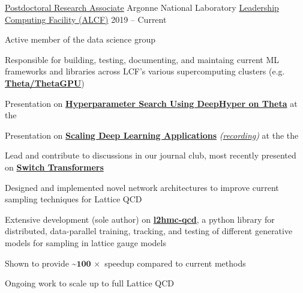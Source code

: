 \begin{cventries}

  \cventry
  {\href{https://www.alcf.anl.gov/about/people/sam-foreman}{\textcolor{awlink}{Postdoctoral Research Associate}}}
  {Argonne National Laboratory}
  {\href{https://www.alcf.anl.gov}{\textcolor{awesome}{Leadership Computing Facility (ALCF)}}}
  {2019 -- Current}
  {
    \begin{cvitems}
    \item {Active member of the data science group}
      \begin{cvsubitems}
      \item{Responsible for building, testing, documenting, and maintaing current ML frameworks and libraries across
        LCF's various supercomputing clusters (e.g.
      \textbf{\href{https://argonne-lcf.github.io/ThetaGPU-Docs/}{Theta/ThetaGPU}})}
      \item{Presentation on \href{https://bit.ly/DeepHyperSDL21}{\textbf{Hyperparameter Search Using DeepHyper on
              Theta}} at the \href{https://github.com/argonne-lcf/sdl_ai_workshop}{\emph{\color{awlink}{ALCF: Simulation, Data, and Learning
        Workshop for AI}}}}
      \item{Presentation on \href{https://bit.ly/scaling_CPW21}{\textbf{Scaling Deep Learning Applications}}}
        \textit{(\href{https://youtu.be/ESbk-ESLhqk}{recording})} at the the
        \href{https://github.com/argonne-lcf/CompPerfWorkshop-2021}{\emph{\color{awlink}{2021 Computational Performance
        Workshop}}}
      \item{Lead and contribute to discussions in our journal club, most recently presented on
        \textbf{\href{https://anl.app.box.com/v/switch-transformers}{Switch Transformers}}}
      \end{cvsubitems}
    \item{Designed and implemented novel network architectures to improve current sampling techniques for Lattice QCD}
    \item{Extensive development (sole author) on
        {\href{https://www.github.com/saforem2/l2hmc-qcd}{\textbf{l2hmc-qcd}}}, a python library for
        distributed, data-parallel training, tracking, and testing of different generative models for sampling in
        lattice gauge models}
      \begin{cvsubitems}
  \item{Shown to provide \textbf{\textasciitilde\(\mathbf{100\,\times}\)} speedup compared to current methods}
      \item{Ongoing work to scale up to full Lattice QCD}
      \end{cvsubitems}
    \end{cvitems}
  }


\end{cventries}
